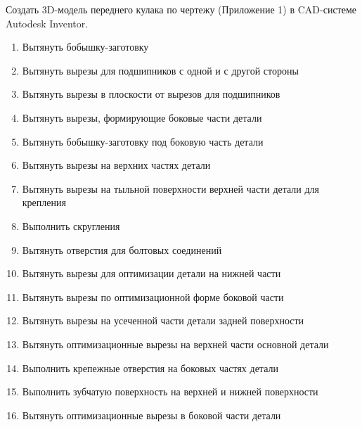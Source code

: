 
Создать 3D-модель переднего кулака по чертежу (Приложение 1) в CAD-системе Autodesk Inventor.


\explaneSection

\begin{enumerate}
    \item Вытянуть бобышку-заготовку
    \item Вытянуть вырезы для подшипников с одной и с другой стороны
    \item Вытянуть вырезы в плоскости от вырезов для подшипников
    \item Вытянуть вырезы, формирующие боковые части детали
    \item Вытянуть бобышку-заготовку под боковую часть детали
    \item Вытянуть вырезы на верхних частях детали
    \item Вытянуть вырезы на тыльной поверхности верхней части детали для крепления
    \item Выполнить скругления 
    \item Вытянуть отверстия для болтовых соединений
    \item Вытянуть вырезы для оптимизации детали на нижней части
    \item Вытянуть вырезы по оптимизационной форме боковой части
    \item Вытянуть вырезы на усеченной части детали задней поверхности
    \item Вытянуть оптимизационные вырезы на верхней части основной детали
    \item Выполнить крепежные отверстия на боковых частях детали
    \item Выполнить зубчатую поверхность на верхней и нижней поверхности
    \item Вытянуть оптимизационные вырезы в боковой части детали
\end{enumerate}